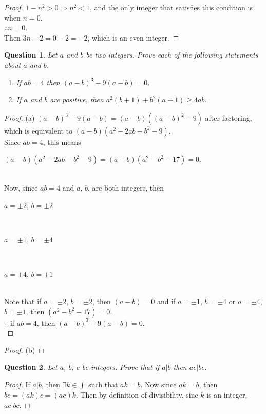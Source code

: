 \documentclass[11pt,oneside]{article}
\newtheorem{question}{Question}
\begin{document}
\begin{proof}
    $1 - n^2 > 0 \Rightarrow n^2 < 1$, and the only integer that satisfies this condition is when $n = 0$.\\
    $\therefore n = 0$.\\
    Then $3n - 2 = 0 - 2 = -2$, which is an even integer.
\end{proof}

\bigskip

\begin{question}
    Let $a$ and $b$ be two integers. Prove each of the following statements about $a$ and $b$. \\
    \begin{enumerate}
    	\item[(a)] If $ab = 4$ then $(a-b)^3 - 9(a-b) = 0$.
    	\item[(b)] If $a$ and $b$ are positive, then $a^2(b+1) + b^2(a+1) \geq 4ab$.  
    \end{enumerate}
\end{question}

\begin{proof}
	 (a) $(a-b)^3 - 9(a-b) = (a-b)((a-b)^2-9)$ after factoring, which is equivalent to $(a-b)(a^2 - 2ab - b^2 - 9)$.\\
	 Since $ab = 4$, this means \\
	 \centerline{$(a-b)(a^2 - 2ab - b^2 - 9) = (a-b)(a^2 - b^2 - 17) = 0$.} \\
	 Now, since $ab=4$ and $a$, $b$, are both integers, then\\
	 \centerline{$a=\pm2$, $b=\pm2$}\\
	 \centerline{$a=\pm1$, $b=\pm4$}\\
	 \centerline{$a=\pm4$, $b=\pm1$}\\
	 Note that if $a=\pm2$, $b=\pm2$, then $(a-b)=0$ and if $a=\pm1$, $b=\pm4$ or $a=\pm4$, $b=\pm1$, then $(a^2 - b^2 - 17) = 0$.\\
	 $\therefore$ if $ab = 4$, then $(a-b)^3 - 9(a-b) = 0$.
	 \\
\end{proof}
\begin{proof}
	(b) 
\end{proof}

\begin{question}
	Let $a$, $b$, $c$ be integers. Prove that if $a | b$ then $ac | bc$.
\end{question}
\begin{proof}
	If $a | b$, then $\exists k \in \int$ such that $ak = b$.
	Now since $ak = b$, then $bc = (ak)c = (ac)k$. Then by definition of divisibility, sine $k$ is an integer, $ac|bc$.
\end{proof}
\end{document}
